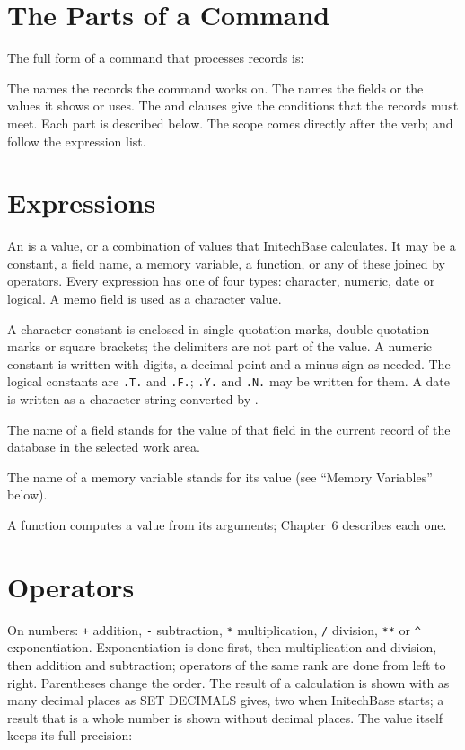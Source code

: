 \section{The Parts of a Command}
The full form of a command that processes records is:


The  names the records the command works on.  The
 names the fields or the values it shows or uses.  The
 and  clauses give the conditions that the records must
meet.  Each part is described below.  The scope comes directly after the verb;
 and  follow the expression list.

\section{Expressions}
An  is a value, or a combination of values that InitechBase
calculates.  It may be a constant, a field name, a memory variable, a
function, or any of these joined by operators.  Every expression has one of
four types: character, numeric, date or logical.  A memo field is used as a
character value.

A character constant is enclosed in single quotation marks,
double quotation marks or square brackets; the delimiters are not part of the
value.  A numeric constant is written with digits, a decimal point and a minus
sign as needed.  The logical constants are \texttt{.T.} and \texttt{.F.};
\texttt{.Y.} and \texttt{.N.} may be written for them.  A date is written as a
character string converted by .

The name of a field stands for the value of that field in the
current record of the database in the selected work area.

The name of a memory variable stands for its value
(see ``Memory Variables'' below).

A function computes a value from its arguments; Chapter~6
describes each one.

\section{Operators}
On numbers: \texttt{+} addition, \texttt{-} subtraction,
\texttt{*} multiplication, \texttt{/} division, \texttt{**} or \texttt{\^{}}
exponentiation.  Exponentiation is done first, then multiplication and
division, then addition and subtraction; operators of the same rank are done
from left to right.  Parentheses change the order.
The result of a calculation is shown with as many decimal places as SET
DECIMALS gives, two when InitechBase starts; a result that is a whole number
is shown without decimal places.  The value itself keeps its full precision:

